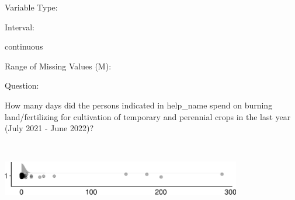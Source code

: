 \documentclass[
]{article}
\begin{document}
\begin{minipage}[t]{0.3\linewidth}

Variable Type:

\end{minipage}%
\begin{minipage}[t]{0.7\linewidth}

\end{minipage}

\begin{minipage}[t]{0.3\linewidth}

Interval:

\end{minipage}%
\begin{minipage}[t]{0.7\linewidth}

continuous

\end{minipage}

\begin{minipage}[t]{0.3\linewidth}

Range of Missing Values (M):

\end{minipage}%
\begin{minipage}[t]{0.7\linewidth}

\end{minipage}

\begin{minipage}[t]{0.3\linewidth}

Question:

\end{minipage}%
\begin{minipage}[t]{0.7\linewidth}

How many days did the persons indicated in help\_name spend on burning
land/fertilizing for cultivation of temporary and perennial crops in the
last year (July 2021 - June 2022)?

\end{minipage}

\begin{minipage}[t]{0.3\linewidth}

~

\end{minipage}%
\begin{minipage}[t]{0.7\linewidth}

\includegraphics[width=396px]{codebook_template_files/figure-latex/q7_32_rainplot-1}

\end{minipage}
 \vspace*{-6mm} 
\end{document}

